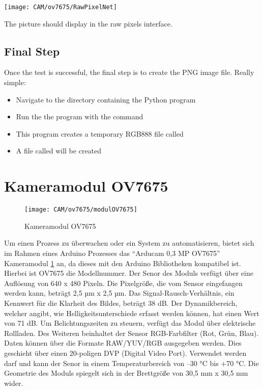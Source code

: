 \begin{center}
    \texttt{[image: CAM/ov7675/RawPixelNet]}
\end{center}
    
The picture should display in the raw pixels interface.

\subsection{Final Step}

Once the test is successful, the final step is to create the PNG image file. Really simple:

\begin{itemize}
  \item Navigate to the directory containing the Python program 
  \item Run the the program with the command
  
  \item This program creates a temporary RGB888 file called 
  \item A file called  will be created    
\end{itemize}
    
\section{Kameramodul OV7675}

\begin{figure}[H]
    \centering
    \texttt{[image: CAM/ov7675/modulOV7675]}
    \caption{Kameramodul OV7675}
    \label{fig:KameramodulOV7675}
\end{figure}

Um einen Prozess zu überwachen oder ein System zu automatisieren, bietet sich im Rahmen eines Arduino Prozesses das “Arducam 0,3 MP OV7675” Kameramodul \ref{fig:KameramodulOV7675} an, da dieses mit den Arduino Bibliotheken kompatibel ist. Hierbei ist OV7675 die Modellnummer. Der Senor des Moduls verfügt über eine Auflösung von 640 x 480 Pixeln. Die Pixelgröße, die vom Sensor eingefangen werden kann, beträgt 2,5 µm x 2,5 µm. Das Signal-Rausch-Verhältnis, ein Kennwert für die Klarheit des Bildes, beträgt 38 dB. Der Dynamikbereich, welcher angibt, wie Helligkeitsunterschiede erfasst werden können, hat einen Wert von 71 dB. Um Belichtungszeiten zu steuern, verfügt das Modul über elektrische Rollladen. Des Weiteren beinhaltet der Sensor  RGB-Farbfilter (Rot, Grün, Blau).
Daten können über die Formate RAW/YUV/RGB ausgegeben werden. Dies geschieht über einen 20-poligen DVP (Digital Video Port). Verwendet werden darf und kann der Senor in einem Temperaturbereich von –30 °C bis +70 °C. Die Geometrie des Moduls spiegelt sich in der Brettgröße von 30,5 mm x 30,5 mm wider. \cite{Arduino:2024a}


